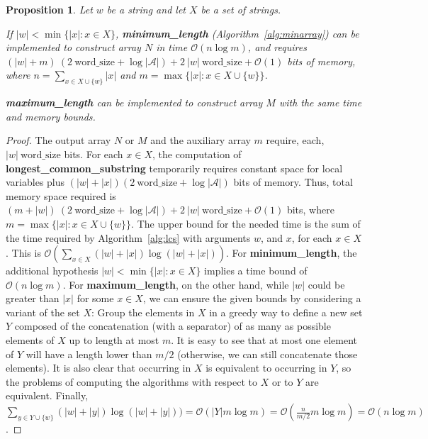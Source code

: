 \documentclass[submission]{dmtcs}
\newcommand{\Ode}{{\mathcal O}}
\newcommand\+[1]{\mathcal{#1}}
\newtheorem{proposition}[theorem]{Proposition}
\newenvironment{my_enumerate}{\begin{enumerate}
  \setlength{\itemsep}{1pt}
  \setlength{\parskip}{0pt}
  \setlength{\parsep}{0pt}}{\end{enumerate}}
\begin{document}
\begin{proposition}\label{prop:complexityM}
Let $w$ be a string and let $X$ be a set of strings.
\begin{my_enumerate}

\item If $|w| < \min\{|x| : x \in X\}$, \textbf{minimum\_length} (Algorithm~\ref{alg:minarray})  can be implemented
to construct array $N$ in time  $\Ode(n \log m)$,
and requires $(|w| + m) \ (2 \ \mbox{word\_size} + \log |\+A| ) + 2 \ |w| \ \mbox{word\_size}
+ \Ode(1)$ bits of memory,
where $n=\sum_{x \in X \cup \{w\}} |x|$ and 
	$m=\max \{|x| : x \in X \cup \{w\}\}$.

\item  \textbf{maximum\_length} can be implemented to construct array $M$ 
with the same time and memory bounds.
 \end{my_enumerate} 
\end{proposition}
\begin{proof}
The output array $N$ or $M$ and the auxiliary array $m$
require, each, $|w| \ \mbox{word\_size}$ bits.
For each $x\in X$, the computation of {\bf longest\_common\_substring}
temporarily requires constant space for local variables plus
$(|w|+|x|)(2 \ \mbox{word\_size} + \log |\+A|)$ bits of memory.
Thus, total memory space required  is
$(m + |w|) \ (2 \ \mbox{word\_size} + \log |\+A| ) + 2 \ |w| \ 
\mbox{word\_size} + \Ode(1)$ bits, where 	$m=\max \{|x| : x \in X \cup \{w\}\}$.
%
The upper bound for the needed time is the sum of the time required by 
Algorithm~\ref{alg:lcs}
with arguments $w$, and $x$, for each $x\in X$.
This is $\Ode(\sum_{x\in X} (|w|+|x|)\log (|w|+|x|))$. For \textbf{minimum\_length},
the additional hypothesis $|w| < \min\{|x| : x \in X\}$ implies a time bound
of $\Ode(n \log m)$. For \textbf{maximum\_length}, on the other hand,
while $|w|$ could be greater than $|x|$ for some $x \in X$,
we can ensure the given bounds by considering a variant of the set $X$: 
Group the elements in $X$ in a greedy way 
to define a new set $Y$ composed of 
the concatenation (with a separator) of as many as possible 
elements of $X$ up to length at most $m$.
It is easy to see that at most one element of $Y$ will have a length lower
than $m/2$ (otherwise, we can still concatenate those elements). It is also
clear that occurring in $X$ is equivalent to occurring in $Y$, so the problems
of computing the algorithms with respect to $X$ or to $Y$ are
equivalent.
Finally, $\sum_{y \in Y \cup \{w\}} (|w|+|y|)\log (|w|+|y|)) =
\Ode(|Y| m \log m) = \Ode(\frac{n}{m/2} m \log m) = \Ode(n \log m)$.
\end{proof}
\end{document}
